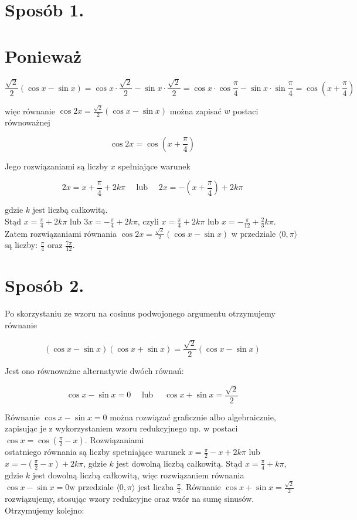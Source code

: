 \documentclass[10pt]{article}
\begin{document}
\section*{Sposób 1.}
\section*{Ponieważ}
$$
\frac{\sqrt{2}}{2}(\cos x-\sin x)=\cos x \cdot \frac{\sqrt{2}}{2}-\sin x \cdot \frac{\sqrt{2}}{2}=\cos x \cdot \cos \frac{\pi}{4}-\sin x \cdot \sin \frac{\pi}{4}=\cos \left(x+\frac{\pi}{4}\right)
$$

więc równanie $\cos 2 x=\frac{\sqrt{2}}{2}(\cos x-\sin x)$ można zapisać $w$ postaci równoważnej

$$
\cos 2 x=\cos \left(x+\frac{\pi}{4}\right)
$$

Jego rozwiązaniami są liczby $x$ spełniające warunek

$$
2 x=x+\frac{\pi}{4}+2 k \pi \quad \text { lub } \quad 2 x=-\left(x+\frac{\pi}{4}\right)+2 k \pi
$$

gdzie $k$ jest liczbą całkowitą.\\
Stąd $x=\frac{\pi}{4}+2 k \pi$ lub $3 x=-\frac{\pi}{4}+2 k \pi$, czyli $x=\frac{\pi}{4}+2 k \pi$ lub $x=-\frac{\pi}{12}+\frac{2}{3} k \pi$.\\
Zatem rozwiązaniami równania $\cos 2 x=\frac{\sqrt{2}}{2}(\cos x-\sin x)$ w przedziale $\langle 0, \pi\rangle$ są liczby: $\frac{\pi}{4}$ oraz $\frac{7 \pi}{12}$.

\section*{Sposób 2.}
Po skorzystaniu ze wzoru na cosinus podwojonego argumentu otrzymujemy równanie

$$
(\cos x-\sin x)(\cos x+\sin x)=\frac{\sqrt{2}}{2}(\cos x-\sin x)
$$

Jest ono równoważne alternatywie dwóch równań:

$$
\cos x-\sin x=0 \quad \text { lub } \quad \cos x+\sin x=\frac{\sqrt{2}}{2}
$$

Równanie $\cos x-\sin x=0$ można rozwiązać graficznie albo algebraicznie, zapisując je z wykorzystaniem wzoru redukcyjnego np. w postaci $\cos x=\cos \left(\frac{\pi}{2}-x\right)$. Rozwiązaniami\\
ostatniego równania są liczby spetniające warunek $x=\frac{\pi}{2}-x+2 k \pi$ lub $x=-\left(\frac{\pi}{2}-x\right)+2 k \pi$, gdzie $k$ jest dowolną liczbą całkowitą. Stąd $x=\frac{\pi}{4}+k \pi$, gdzie $k$ jest dowolną liczbą całkowitą, więc rozwiązaniem równania $\cos x-\sin x=0 \mathrm{w}$ przedziale $\langle 0, \pi\rangle$ jest liczba $\frac{\pi}{4}$. Równanie $\cos x+\sin x=\frac{\sqrt{2}}{2}$ rozwiązujemy, stosując wzory redukcyjne oraz wzór na sumę sinusów. Otrzymujemy kolejno:
\end{document}

